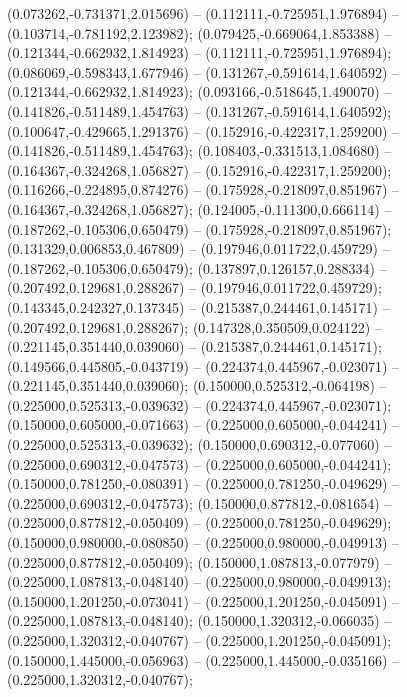  (0.073262,-0.731371,2.015696) -- (0.112111,-0.725951,1.976894) -- (0.103714,-0.781192,2.123982);
 (0.079425,-0.669064,1.853388) -- (0.121344,-0.662932,1.814923) -- (0.112111,-0.725951,1.976894);
 (0.086069,-0.598343,1.677946) -- (0.131267,-0.591614,1.640592) -- (0.121344,-0.662932,1.814923);
 (0.093166,-0.518645,1.490070) -- (0.141826,-0.511489,1.454763) -- (0.131267,-0.591614,1.640592);
 (0.100647,-0.429665,1.291376) -- (0.152916,-0.422317,1.259200) -- (0.141826,-0.511489,1.454763);
 (0.108403,-0.331513,1.084680) -- (0.164367,-0.324268,1.056827) -- (0.152916,-0.422317,1.259200);
 (0.116266,-0.224895,0.874276) -- (0.175928,-0.218097,0.851967) -- (0.164367,-0.324268,1.056827);
 (0.124005,-0.111300,0.666114) -- (0.187262,-0.105306,0.650479) -- (0.175928,-0.218097,0.851967);
 (0.131329,0.006853,0.467809) -- (0.197946,0.011722,0.459729) -- (0.187262,-0.105306,0.650479);
 (0.137897,0.126157,0.288334) -- (0.207492,0.129681,0.288267) -- (0.197946,0.011722,0.459729);
 (0.143345,0.242327,0.137345) -- (0.215387,0.244461,0.145171) -- (0.207492,0.129681,0.288267);
 (0.147328,0.350509,0.024122) -- (0.221145,0.351440,0.039060) -- (0.215387,0.244461,0.145171);
 (0.149566,0.445805,-0.043719) -- (0.224374,0.445967,-0.023071) -- (0.221145,0.351440,0.039060);
 (0.150000,0.525312,-0.064198) -- (0.225000,0.525313,-0.039632) -- (0.224374,0.445967,-0.023071);
 (0.150000,0.605000,-0.071663) -- (0.225000,0.605000,-0.044241) -- (0.225000,0.525313,-0.039632);
 (0.150000,0.690312,-0.077060) -- (0.225000,0.690312,-0.047573) -- (0.225000,0.605000,-0.044241);
 (0.150000,0.781250,-0.080391) -- (0.225000,0.781250,-0.049629) -- (0.225000,0.690312,-0.047573);
 (0.150000,0.877812,-0.081654) -- (0.225000,0.877812,-0.050409) -- (0.225000,0.781250,-0.049629);
 (0.150000,0.980000,-0.080850) -- (0.225000,0.980000,-0.049913) -- (0.225000,0.877812,-0.050409);
 (0.150000,1.087813,-0.077979) -- (0.225000,1.087813,-0.048140) -- (0.225000,0.980000,-0.049913);
 (0.150000,1.201250,-0.073041) -- (0.225000,1.201250,-0.045091) -- (0.225000,1.087813,-0.048140);
 (0.150000,1.320312,-0.066035) -- (0.225000,1.320312,-0.040767) -- (0.225000,1.201250,-0.045091);
 (0.150000,1.445000,-0.056963) -- (0.225000,1.445000,-0.035166) -- (0.225000,1.320312,-0.040767);

